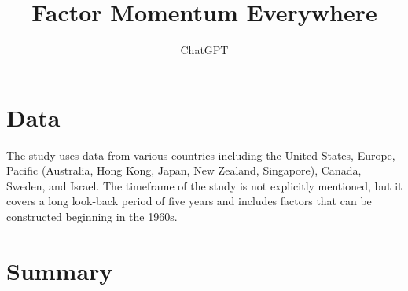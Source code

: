 \documentclass{article}
\title{Factor Momentum Everywhere}
\author{ChatGPT}
\begin{document}
 

\maketitle
\section{Data}
The study uses data from various countries including the United States, Europe, Pacific (Australia, Hong Kong, Japan, New Zealand, Singapore), Canada, Sweden, and Israel. The timeframe of the study is not explicitly mentioned, but it covers a long look-back period of five years and includes factors that can be constructed beginning in the 1960s. 
\section{Summary}
\end{document}
